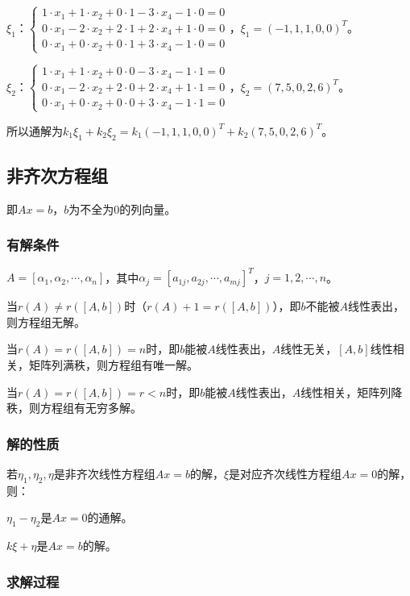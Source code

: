 \documentclass[UTF8, 12pt]{ctexart}
\begin{document}
$\xi_1$：$\left\{\begin{array}{l}
1\cdot x_1+1\cdot x_2+0\cdot1-3\cdot x_4-1\cdot0=0 \\
0\cdot x_1-2\cdot x_2+2\cdot1+2\cdot x_4+1\cdot0=0 \\
0\cdot x_1+0\cdot x_2+0\cdot1+3\cdot x_4-1\cdot0=0
\end{array}\right.$，$\xi_1=(-1,1,1,0,0)^T$。

$\xi_2$：$\left\{\begin{array}{l}
1\cdot x_1+1\cdot x_2+0\cdot0-3\cdot x_4-1\cdot1=0 \\
0\cdot x_1-2\cdot x_2+2\cdot0+2\cdot x_4+1\cdot1=0 \\
0\cdot x_1+0\cdot x_2+0\cdot0+3\cdot x_4-1\cdot1=0
\end{array}\right.$，$\xi_2=(7,5,0,2,6)^T$。\medskip

所以通解为$k_1\xi_1+k_2\xi_2=k_1(-1,1,1,0,0)^T+k_2(7,5,0,2,6)^T$。

\subsection{非齐次方程组}

即$Ax=b$，$b$为不全为0的列向量。

\subsubsection{有解条件}

$A=[\alpha_1,\alpha_2,\cdots,\alpha_n]$，其中$\alpha_j=[a_{1j},a_{2j},\cdots,a_{mj}]^T$，$j=1,2,\cdots,n$。

当$r(A)\neq r([A,b])$时（$r(A)+1=r([A,b])$），即$b$不能被$A$线性表出，则方程组无解。

当$r(A)=r([A,b])=n$时，即$b$能被$A$线性表出，$A$线性无关，$[A,b]$线性相关，矩阵列满秩，则方程组有唯一解。

当$r(A)=r([A,b])=r<n$时，即$b$能被$A$线性表出，$A$线性相关，矩阵列降秩，则方程组有无穷多解。

\subsubsection{解的性质}

若$\eta_1,\eta_2,\eta$是非齐次线性方程组$Ax=b$的解，$\xi$是对应齐次线性方程组$Ax=0$的解，则：

$\eta_1-\eta_2$是$Ax=0$的通解。

$k\xi+\eta$是$Ax=b$的解。

\subsubsection{求解过程}
\end{document}
